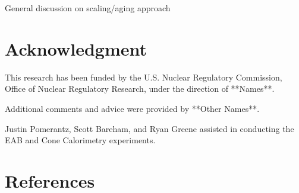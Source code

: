 General discussion on scaling/aging approach

\newpage

\section{Acknowledgment}

This research has been funded by the U.S. Nuclear Regulatory Commission, Office of Nuclear Regulatory Research, under the direction of **Names**.

Additional comments and advice were provided by **Other Names**.

Justin Pomerantz, Scott Bareham, and Ryan Greene assisted in conducting the EAB and Cone Calorimetry experiments. 




\clearpage
\section*{References}






